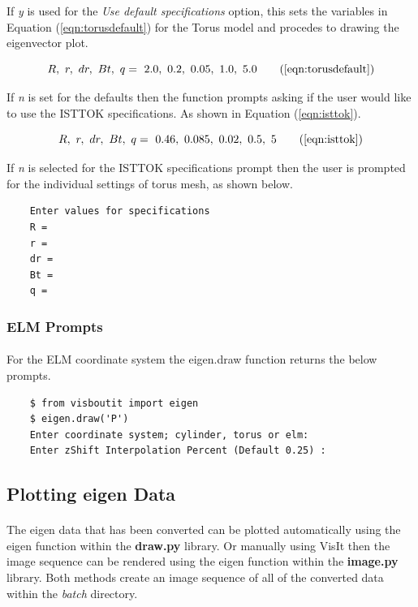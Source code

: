 \documentclass[12pt,a4paper]{article}
\begin{document}
	If \textit{y} is used for the \textit{Use default specifications} option, this sets the variables in Equation (\ref{eqn:torusdefault}) for the Torus model and procedes to drawing the eigenvector plot.
	
	\begin{equation}
	R ,\ r ,\ dr ,\ Bt ,\ q = \ 2.0 ,\ 0.2 ,\ 0.05 , \ 1.0 , \ 5.0
	\tag{\ref{eqn:torusdefault}}
	\end{equation}

	 If \textit{n} is set for the defaults then the function prompts asking if the user would like to use the ISTTOK specifications. As shown in Equation (\ref{eqn:isttok}).
	 
	 \begin{equation}
	 R ,\ r ,\ dr ,\ Bt ,\ q = \ 0.46 ,\ 0.085 ,\ 0.02 , \ 0.5 , \ 5
	 \tag{\ref{eqn:isttok}}
	 \end{equation}
	
	If \textit{n} is selected for the ISTTOK specifications prompt then the user is prompted for the individual settings of torus mesh, as shown below.
	
	\begin{verbatim}
	Enter values for specifications
	R = 
	r =
	dr =
	Bt = 
	q = 
	\end{verbatim}
	
	\subsubsection{ELM Prompts}
	\paragraph{}
	For the ELM coordinate system the eigen.draw function returns the below prompts.
	\begin{verbatim}
	$ from visboutit import eigen
	$ eigen.draw('P')
	Enter coordinate system; cylinder, torus or elm: 
	Enter zShift Interpolation Percent (Default 0.25) :
	\end{verbatim}

	\subsection{Plotting eigen Data}
	\paragraph{}
	The eigen data that has been converted can be plotted automatically using the eigen function within the \textbf{draw.py} library. Or manually using VisIt then the image sequence can be rendered using the eigen function within the \textbf{image.py} library. Both methods create an image sequence of all of the converted data within the \textit{batch} directory.
	
\end{document}
